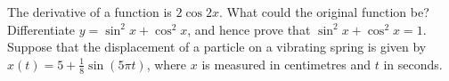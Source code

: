 \begin{questions}
\begin{multicols}{2}
    \end{multicols}
  \questioA The derivative of a function is $ 2 \cos 2x $. What could the original function be?
  \questioM Differentiate $ y = \sin^2 x + \cos^2 x $, and hence prove that $ \sin^2 x + \cos^2 x = 1 $.
  \questioA Suppose that the displacement of a particle on a vibrating spring is given by $ x(t) =  5 + \frac{1}{8} \sin(5\pi t) $,
            where $ x $ is measured in centimetres and $ t $ in seconds.
\end{questions}
